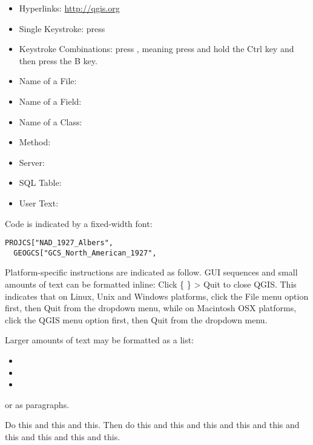 \begin{itemize}
%
\item Hyperlinks: \url{http://qgis.org}
%
\item Single Keystroke: press 
\item Keystroke Combinations: press , meaning press and
hold the Ctrl key and then press the B key.
\item Name of a File: 
\item Name of a Field: 
\item Name of a Class: 
\item Method: 
\item Server: 
\item SQL Table:     
%
\item User Text: 
\end{itemize}

Code is indicated by a fixed-width font:
\begin{verbatim}
PROJCS["NAD_1927_Albers",
  GEOGCS["GCS_North_American_1927",
\end{verbatim}

Platform-specific instructions are indicated as follow.
GUI sequences and small amounts of text can be formatted inline: %
Click \{\nix{} \} > Quit to %
close QGIS. This indicates that on Linux, Unix and Windows platforms, %
click the File menu option first, then Quit from the dropdown menu, while on %
Macintosh OSX platforms, click the QGIS menu option first, then Quit from the %
dropdown menu.

Larger amounts of text may be formatted as a list:
\begin{itemize}
\item {} 
\item {} 
\item {}
\end{itemize}
or as paragraphs.

\nix{}Do this and this and this. Then do this
and this and this
and this and this
and this and this
and this and this.

